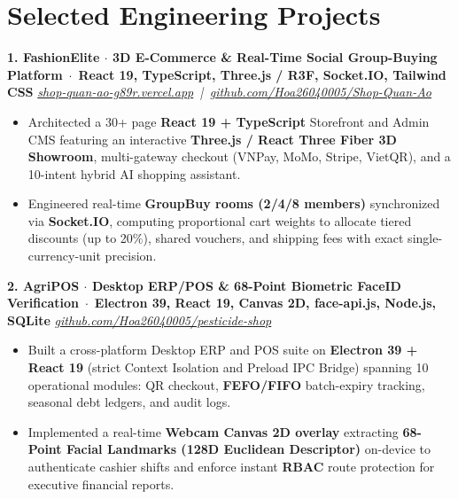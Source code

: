 \documentclass[10pt,a4paper]{article}
\newcommand{\resumeProject}[3]{
  \vspace{2pt}
  \noindent\textbf{#1} \,$\cdot$\, {\footnotesize\textbf{\color{accent}#2}} \hfill {\footnotesize\textit{#3}} \\
}
\begin{document}
\section{Selected Engineering Projects}

\resumeProject{1. FashionElite $\cdot$ 3D E-Commerce \& Real-Time Social Group-Buying Platform}{React 19, TypeScript, Three.js / R3F, Socket.IO, Tailwind CSS}{\href{https://shop-quan-ao-g89r.vercel.app}{shop-quan-ao-g89r.vercel.app} \,|\, \href{https://github.com/Hoa26040005/Shop-Quan-Ao}{github.com/Hoa26040005/Shop-Quan-Ao}}
{\footnotesize
\begin{itemize}
  \item Architected a 30+ page \textbf{React 19 + TypeScript} Storefront and Admin CMS featuring an interactive \textbf{Three.js / React Three Fiber 3D Showroom}, multi-gateway checkout (VNPay, MoMo, Stripe, VietQR), and a 10-intent hybrid AI shopping assistant.
  \item Engineered real-time \textbf{GroupBuy rooms (2/4/8 members)} synchronized via \textbf{Socket.IO}, computing proportional cart weights to allocate tiered discounts (up to 20\%), shared vouchers, and shipping fees with exact single-currency-unit precision.
\end{itemize}
}

\resumeProject{2. AgriPOS $\cdot$ Desktop ERP/POS \& 68-Point Biometric FaceID Verification}{Electron 39, React 19, Canvas 2D, face-api.js, Node.js, SQLite}{\href{https://github.com/Hoa26040005/pesticide-shop}{github.com/Hoa26040005/pesticide-shop}}
{\footnotesize
\begin{itemize}
  \item Built a cross-platform Desktop ERP and POS suite on \textbf{Electron 39 + React 19} (strict Context Isolation and Preload IPC Bridge) spanning 10 operational modules: QR checkout, \textbf{FEFO/FIFO} batch-expiry tracking, seasonal debt ledgers, and audit logs.
  \item Implemented a real-time \textbf{Webcam Canvas 2D overlay} extracting \textbf{68-Point Facial Landmarks (128D Euclidean Descriptor)} on-device to authenticate cashier shifts and enforce instant \textbf{RBAC} route protection for executive financial reports.
\end{itemize}
}
\end{document}
